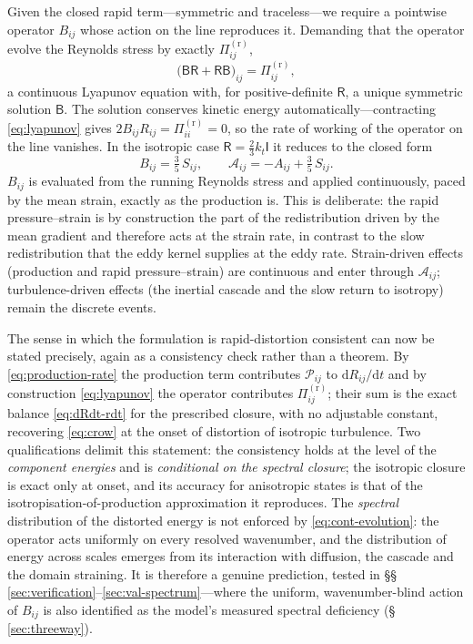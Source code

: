 \documentclass[11pt,a4paper]{article}
\begin{document}
Given the closed rapid term---symmetric and traceless---we require a
pointwise operator $B_{ij}$ whose action on the line reproduces it.
Demanding that the operator evolve the Reynolds stress by exactly
$\Pi^{(\mathrm r)}_{ij}$,
\begin{equation}
  \big(\mathsf{B}\mathsf{R}+\mathsf{R}\mathsf{B}\big)_{ij}
  = \Pi^{(\mathrm r)}_{ij},
  \label{eq:lyapunov}
\end{equation}
a continuous Lyapunov equation with, for positive-definite
$\mathsf{R}$, a unique symmetric solution $\mathsf{B}$. The solution
conserves kinetic energy automatically---contracting \eqref{eq:lyapunov}
gives $2B_{ij}R_{ij}=\Pi^{(\mathrm r)}_{ii}=0$, so the rate of working of
the operator on the line vanishes. In the isotropic case
$\mathsf{R}=\tfrac23k_t\mathsf{I}$ it reduces to the closed form
\begin{equation}
  B_{ij} = \tfrac{3}{5}\,S_{ij},
  \qquad
  \mathcal{A}_{ij} = -A_{ij} + \tfrac{3}{5}\,S_{ij}.
  \label{eq:iso-B}
\end{equation}
$B_{ij}$ is evaluated from the running Reynolds stress and applied
continuously, paced by the mean strain, exactly as the production is.
This is deliberate: the rapid pressure--strain is by construction the
part of the redistribution driven by the mean gradient and therefore acts
at the strain rate, in contrast to the slow redistribution that the eddy
kernel supplies at the eddy rate. Strain-driven effects (production and
rapid pressure--strain) are continuous and enter through
$\mathcal{A}_{ij}$; turbulence-driven effects (the inertial cascade and
the slow return to isotropy) remain the discrete events.

The sense in which the formulation is rapid-distortion consistent can now
be stated precisely, again as a consistency check rather than a theorem.
By \eqref{eq:production-rate} the production term contributes
$\mathcal{P}_{ij}$ to $\mathrm{d}R_{ij}/\mathrm{d}t$ and by construction
\eqref{eq:lyapunov} the operator contributes $\Pi^{(\mathrm r)}_{ij}$;
their sum is the exact balance \eqref{eq:dRdt-rdt} for the prescribed
closure, with no adjustable constant, recovering \eqref{eq:crow} at the
onset of distortion of isotropic turbulence. Two qualifications delimit
this statement: the consistency holds at the level of the
\emph{component energies} and is \emph{conditional on the
spectral closure}; the isotropic closure is exact only at onset, and its
accuracy for anisotropic states is that of the
isotropisation-of-production approximation it reproduces. The
\emph{spectral} distribution of the distorted energy is not enforced by
\eqref{eq:cont-evolution}: the operator acts uniformly on every resolved
wavenumber, and the distribution of energy across scales emerges from
its interaction with diffusion, the cascade and the domain straining. It
is therefore a genuine prediction, tested in
\S\S\,\ref{sec:verification}--\ref{sec:val-spectrum}---where the
uniform, wavenumber-blind action of $B_{ij}$ is also identified as the
model's measured spectral deficiency (\S\,\ref{sec:threeway}).
\end{document}
